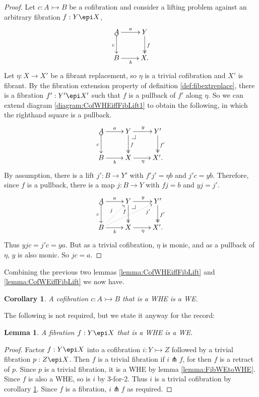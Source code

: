 \documentclass[11pt]{article}
\makeatletter
\newcommand{\pbcorner}[1][dr]{\save*!/#1-1.2pc/#1:(-1,1)@^{|-}\restore}
\newcommand{\mono}{\ensuremath{\rightarrowtail}}
\newcommand{\ra}{\ensuremath{\rightarrow}}
\newtheorem{lemma}[theorem]{Lemma}
\newtheorem{corollary}[theorem]{Corollary}
\theoremstyle{remark}
\theoremstyle{definition}
\makeatother
\begin{document}
\begin{proof}
Let $c : A\mono B$ be a cofibration and consider a lifting problem against an arbitrary fibration $f: Y\epi X$,
\begin{equation}\label{diagram:CofWHEiffFibLift1}
\xymatrix{
A \ar@{>->}[d]_{c} \ar[r]^-{a}  & Y \ar@{>>}[d]^{f} \\
B \ar[r]_{b} &  X.
}
\end{equation}
Let $\eta: X\ra X'$ be a fibrant replacement, so $\eta$ is a trivial cofibration and $X'$ is fibrant. 
By the fibration extension property of definition \ref{def:fibextreplace}, there is a fibration $f' : Y' \epi X'$ such that $f$ is a pullback of $f'$ along $\eta$. So we can extend diagram \eqref{diagram:CofWHEiffFibLift1} to obtain the following, in which the righthand square is a pullback.
\begin{equation}\label{diagram:CofWHEiffFibLift2}
\xymatrix{
A \ar@{>->}[d]_{c} \ar[r]^-{a}  & Y \ar@{>>}[d]^{f} {\pbcorner} \ar[r]^{y} & Y' \ar@{>>}[d]^{f'} \\
B \ar[r]_{b} &  X  \ar[r]_\eta &  X'.
}
\end{equation}
By assumption, there is a lift $j' : B\ra Y'$ with $f' j' = \eta b$ and $j'c = yb$.  Therefore, since $f$ is a pullback, there is a map $j : B\ra Y$ with $fj = b$ and $y j = j'$.  
\begin{equation}\label{diagram:CofWHEiffFibLift2}
\xymatrix{
A \ar@{>->}[d]_{c} \ar[r]^-{a}  & Y \ar@{>>}[d]_<<<<{f} {\pbcorner} \ar[r]^{y} & Y' \ar@{>>}[d]^{f'} \\
B \ar[r]_{b} \ar@{..>}[ru]^{j} \ar@{..>}[rru]_>>>>{j'} &  X  \ar[r]_\eta &  X'.
}
\end{equation}
Thus $yjc = j'c = ya$.  But as a trivial cofibration, $\eta$ is monic, and as a pullback of $\eta$, $y$ is also monic. So $jc=a$.
\end{proof}

Combining the previous two lemmas \ref{lemma:CofWHEiffFibLift} and \ref{lemma:CofWEiffFibLift} we now have.

\begin{corollary}\label{cor:CofWHEtoWE}
A cofibration $ c : A \mono B$ that is a WHE is a WE.
\end{corollary}

The following is not required, but we state it anyway for the record:

\begin{lemma}\label{lemma:FibWHEtoWE}
A fibration $ f : Y \epi X$ that is a WHE is a WE.
\end{lemma}
\begin{proof}
Factor $ f : Y \epi X$ into a cofibration $i : Y\mono Z$ followed by a trivial fibration $p: Z\epi X$.  Then $f$ is a trivial fibration if $i\pitchfork f$, for then $f$ is a retract of $p$.  Since $p$ is a trivial fibration, it is a WHE by lemma \ref{lemma:FibWEtoWHE}.  Since $f$ is also a WHE, so is $i$ by 3-for-2.  Thus $i$ is a trivial cofibration by corollary \ref{cor:CofWHEtoWE}. Since $f$ is a fibration, $i\pitchfork f$ as required.
\end{proof}
\end{document}
